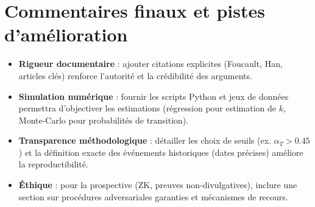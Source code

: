 \documentclass[11pt,a4paper]{article}
\begin{document}
\bigskip
\section*{Commentaires finaux et pistes d'amélioration}
\begin{itemize}[noitemsep]
  \item \textbf{Rigueur documentaire} : ajouter citations explicites (Foucault, Han, articles clés) renforce l'autorité et la crédibilité des arguments.
  \item \textbf{Simulation numérique} : fournir les scripts Python et jeux de données permettra d'objectiver les estimations (régression pour estimation de $k$, Monte-Carlo pour probabilités de transition).
  \item \textbf{Transparence méthodologique} : détailler les choix de seuils (ex. $\alpha_T>0.45$) et la définition exacte des événements historiques (dates précises) améliore la reproductibilité.
  \item \textbf{Éthique} : pour la prospective (ZK, preuves non-divulgatives), inclure une section sur procédures adversariales garanties et mécanismes de recours.
\end{itemize}

\vfill
\end{document}
